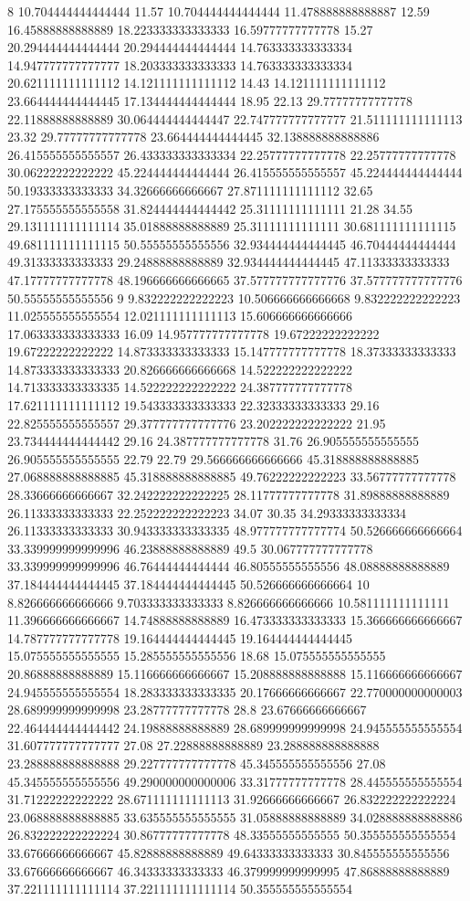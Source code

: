 8 10.704444444444444 11.57 10.704444444444444 11.478888888888887 12.59 16.45888888888889 18.223333333333333 16.59777777777778 15.27 20.294444444444444 20.294444444444444 14.763333333333334 14.947777777777777 18.203333333333333 14.763333333333334 20.621111111111112 14.121111111111112 14.43 14.121111111111112 23.664444444444445 17.134444444444444 18.95 22.13 29.77777777777778 22.11888888888889 30.064444444444447 22.747777777777777 21.511111111111113 23.32 29.77777777777778 23.664444444444445 32.138888888888886 26.415555555555557 26.433333333333334 22.25777777777778 22.25777777777778 30.06222222222222 45.224444444444444 26.415555555555557 45.224444444444444 50.19333333333333 34.32666666666667 27.871111111111112 32.65 27.175555555555558 31.824444444444442 25.31111111111111 21.28 34.55 29.131111111111114 35.01888888888889 25.31111111111111 30.681111111111115 49.681111111111115 50.55555555555556 32.934444444444445 46.70444444444444 49.31333333333333 29.24888888888889 32.934444444444445 47.11333333333333 47.17777777777778 48.196666666666665 37.577777777777776 37.577777777777776 50.55555555555556
9 9.832222222222223 10.506666666666668 9.832222222222223 11.025555555555554 12.021111111111113 15.606666666666666 17.063333333333333 16.09 14.957777777777778 19.67222222222222 19.67222222222222 14.873333333333333 15.147777777777778 18.37333333333333 14.873333333333333 20.826666666666668 14.522222222222222 14.713333333333335 14.522222222222222 24.387777777777778 17.621111111111112 19.543333333333333 22.32333333333333 29.16 22.825555555555557 29.377777777777776 23.202222222222222 21.95 23.734444444444442 29.16 24.387777777777778 31.76 26.905555555555555 26.905555555555555 22.79 22.79 29.566666666666666 45.318888888888885 27.068888888888885 45.318888888888885 49.76222222222223 33.56777777777778 28.33666666666667 32.242222222222225 28.11777777777778 31.89888888888889 26.11333333333333 22.252222222222223 34.07 30.35 34.29333333333334 26.11333333333333 30.943333333333335 48.977777777777774 50.526666666666664 33.339999999999996 46.23888888888889 49.5 30.067777777777778 33.339999999999996 46.76444444444444 46.80555555555556 48.08888888888889 37.184444444444445 37.184444444444445 50.526666666666664
10 8.826666666666666 9.703333333333333 8.826666666666666 10.581111111111111 11.396666666666667 14.74888888888889 16.473333333333333 15.366666666666667 14.787777777777778 19.164444444444445 19.164444444444445 15.075555555555555 15.285555555555556 18.68 15.075555555555555 20.86888888888889 15.116666666666667 15.208888888888888 15.116666666666667 24.945555555555554 18.283333333333335 20.17666666666667 22.770000000000003 28.689999999999998 23.28777777777778 28.8 23.67666666666667 22.464444444444442 24.19888888888889 28.689999999999998 24.945555555555554 31.607777777777777 27.08 27.22888888888889 23.288888888888888 23.288888888888888 29.227777777777778 45.345555555555556 27.08 45.345555555555556 49.290000000000006 33.31777777777778 28.445555555555554 31.71222222222222 28.671111111111113 31.92666666666667 26.832222222222224 23.068888888888885 33.635555555555555 31.05888888888889 34.028888888888886 26.832222222222224 30.86777777777778 48.33555555555555 50.355555555555554 33.67666666666667 45.82888888888889 49.64333333333333 30.845555555555556 33.67666666666667 46.34333333333333 46.379999999999995 47.86888888888889 37.221111111111114 37.221111111111114 50.355555555555554

